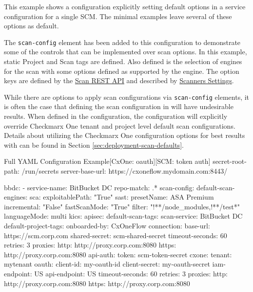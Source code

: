 This example shows a \cxoneflow configuration explicitly setting default options in a service 
configuration for a single SCM.  The minimal examples leave several of these options as default.

The \texttt{scan-config} element has been added to this configuration to
demonstrate some of the controls that can be implemented over scan options.  In this
example, static Project and Scan tags are defined.  Also defined is the selection
of engines for the scan with some options defined as supported by the engine.  The
option keys are defined by the
\href{https://checkmarx.stoplight.io/docs/checkmarx-one-api-reference-guide/branches/main/f601dd9456e80-run-a-scan}{Scan REST API}
and described by
\href{https://checkmarx.com/resource/documents/en/34965-68598-global-settings.html#UUID-8e38f06b-45d4-ea7f-5ff5-50deb22e43aa_UUID-1a4211ec-dbf9-a180-cb20-59e1246ec3fb}{Scanners Settings}.

While there are options to apply scan configurations via \texttt{scan-config} elements, it is often the case that defining the scan configuration
in \cxoneflow will have undesirable results.  When defined in the \cxoneflow configuration, the configuration will explicitly override Checkmarx One
tenant and project level default scan configurations.  Details about utilizing the Checkmarx One configuration options for best results with \cxoneflow
can be found in Section \ref{sec:deployment-scan-defaults}.

\begin{code}{Full YAML Configuration Example}{[CxOne: oauth]}{[SCM: token auth]}
secret-root-path: /run/secrets
server-base-url: https://cxoneflow.mydomain.com:8443/

bbdc:
    - service-name: BitBucket DC
      repo-match: .*
      scan-config:
          default-scan-engines:
              sca:
                  exploitablePath: "True"
              sast:
                  presetName: ASA Premium
                  incremental: "False"
                  fastScanMode: "True"
                  filter: "!**/node_modules,!**/test*"
                  languageMode: multi
              kics:
              apisec:
          default-scan-tags:
              scan-service: BitBucket DC
          default-project-tags:
              onboarded-by: CxOneFlow
      connection:
          base-url: https://scm.corp.com
          shared-secret: scm-shared-secret
          timeout-seconds: 60
          retries: 3
          proxies:
            http: http://proxy.corp.com:8080
            https: http://proxy.corp.com:8080
          api-auth:
              token: scm-token-secret
      cxone:
          tenant: mytenant
          oauth:
              client-id: my-oauth-id
              client-secret: my-oauth-secret
          iam-endpoint: US
          api-endpoint: US
          timeout-seconds: 60
          retries: 3
          proxies:
            http: http://proxy.corp.com:8080
            https: http://proxy.corp.com:8080
\end{code}


